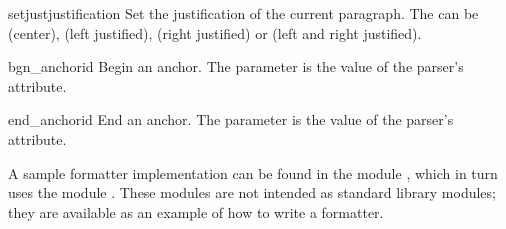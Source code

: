 \begin{funcdesc}{setjust}{justification}
Set the justification of the current paragraph.  The
 can be  (center),  (left
justified),  (right justified) or  (left and
right justified).
\end{funcdesc}

\begin{funcdesc}{bgn_anchor}{id}
Begin an anchor.  The  parameter is the value of the parser's
 attribute.
\end{funcdesc}

\begin{funcdesc}{end_anchor}{id}
End an anchor.  The  parameter is the value of the parser's
 attribute.
\end{funcdesc}

A sample formatter implementation can be found in the module
, which in turn uses the module .  These modules are
not intended as standard library modules; they are available as an
example of how to write a formatter.
